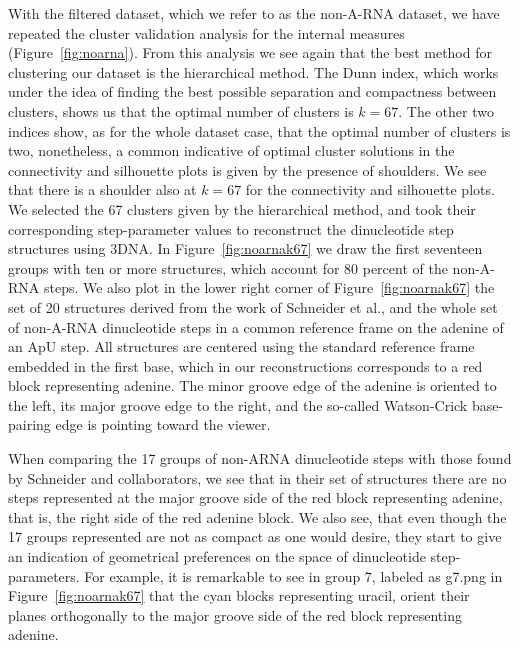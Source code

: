 With the filtered dataset, which we refer to as the non-A-RNA dataset,
we  have repeated  the cluster  validation analysis  for  the internal
measures  (Figure~\ref{fig:noarna}). From this  analysis we  see again
that the  best method for  clustering our dataset is  the hierarchical
method. The Dunn index, which works under the idea of finding the best
possible separation  and compactness  between clusters, shows  us that
the optimal number of clusters  is $k=67$. The other two indices show,
as for the whole dataset case,  that the optimal number of clusters is
two, nonetheless, a common  indicative of optimal cluster solutions in
the  connectivity and  silhouette plots  is given  by the  presence of
shoulders.  We  see that there  is a shoulder  also at $k=67$  for the
connectivity and  silhouette plots. We selected the  67 clusters given
by   the   hierarchical   method,   and   took   their   corresponding
step-parameter values to  reconstruct the dinucleotide step structures
using 3DNA.  In Figure~\ref{fig:noarnak67} we draw the first seventeen
groups with  ten or more structures,  which account for  80 percent of
the  non-A-RNA steps.   We  also plot  in  the lower  right corner  of
Figure~\ref{fig:noarnak67} the  set of 20 structures  derived from the
work  of Schneider et  al.\cite{schneider2004}, and  the whole  set of
non-A-RNA  dinucleotide  steps in  a  common  reference  frame on  the
adenine  of  an ApU  step.   All  structures  are centered  using  the
standard  reference frame  embedded in  the first  base, which  in our
reconstructions corresponds  to a red block  representing adenine. The
minor groove  edge of the adenine  is oriented to the  left, its major
groove edge to the  right, and the so-called Watson-Crick base-pairing
edge is pointing toward the viewer.

When comparing the 17 groups of non-ARNA dinucleotide steps with those
found  by Schneider and  collaborators, we  see that  in their  set of
structures there are no steps  represented at the major groove side of
the red block representing adenine, that is, the right side of the red
adenine block. We also see, that even though the 17 groups represented
are  not  as compact  as  one  would desire,  they  start  to give  an
indication  of geometrical  preferences on  the space  of dinucleotide
step-parameters.  For  example, it  is remarkable to  see in  group 7,
labeled as  g7.png in Figure~\ref{fig:noarnak67} that  the cyan blocks
representing  uracil, orient  their planes  orthogonally to  the major
groove side of the red block representing adenine.

